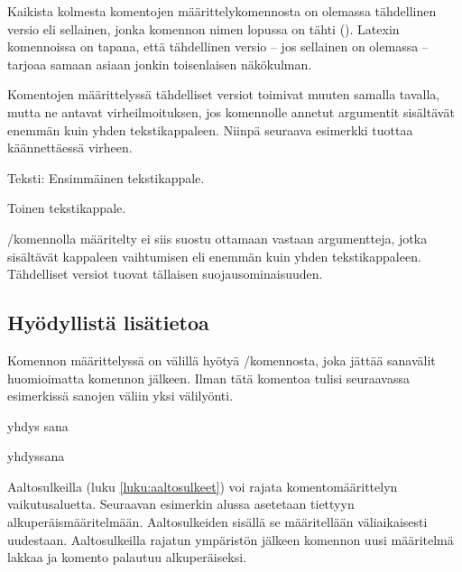 Kaikista kolmesta komentojen määrittelykomennosta on olemassa
tähdellinen versio eli sellainen, jonka komennon nimen lopussa on tähti
(\koodi{*}). Latexin komennoissa on tapana, että tähdellinen versio --
jos sellainen on olemassa -- tarjoaa samaan asiaan jonkin toisenlaisen
näkökulman.

\begin{koodilohkosis}
  \newcommand*     {\nimi}[n][oletus]{määritelmä}
  \renewcommand*   {\nimi}[n][oletus]{määritelmä}
  \providecommand* {\nimi}[n][oletus]{määritelmä}
\end{koodilohkosis}

Komentojen määrittelyssä tähdelliset versiot toimivat muuten samalla
tavalla, mutta ne antavat virheilmoituksen, jos komennolle annetut
argumentit sisältävät enemmän kuin yhden tekstikappaleen. Niinpä
seuraava esimerkki tuottaa käännettäessä virheen.

\begin{koodilohkosis}
  \newcommand*{\komento}[1]{Teksti: #1}

  \komento{
    Ensimmäinen tekstikappale.

    Toinen tekstikappale.
  }
\end{koodilohkosis}

\-/komennolla määritelty 
ei siis suostu ottamaan vastaan argumentteja, jotka sisältävät kappaleen
vaihtumisen eli enemmän kuin yhden tekstikappaleen. Tähdelliset versiot
tuovat tällaisen suo\-jaus\-omi\-nai\-suu\-den.

\subsection{Hyödyllistä lisätietoa}
\label{luku:komennot-lisä}

Komennon määrittelyssä on välillä hyötyä \-/komennosta, joka jättää sanavälit huomioimatta
komennon jälkeen. Ilman tätä komentoa tulisi seuraavassa esimerkissä
sanojen väliin yksi välilyönti.

\pagebreak[3]

\begin{koodilohkosis}
  \newcommand{\komento}[1]{#1\ignorespaces}
  \komento{yhdys}       sana
\end{koodilohkosis}

\begin{tulossis}
  yhdyssana
\end{tulossis}

Aaltosulkeilla (luku \ref{luku:aaltosulkeet}) voi rajata
komentomäärittelyn vai\-ku\-tus\-aluet\-ta. Seuraavan esimerkin alussa
asetetaan  tiettyyn alkuperäismääritelmään.
Aaltosulkeiden sisällä se määritellään väliaikaisesti uudestaan.
Aaltosulkeilla rajatun ympäristön jälkeen komennon uusi määritelmä
lakkaa ja komento palautuu alkuperäiseksi.

